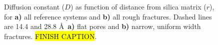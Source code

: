 %
\begin{figure}[htpb]%
\setlength{\myfigwidth}{0.58\textwidth}%
\makebox[\textwidth][c]{ %
    \begin{minipage}[t]{\myfigwidth}%
        \centering%
        \subcaption{\label{fig:diffusion_reference_systems}}%
    \end{minipage}%
    \hfill%
    \begin{minipage}[t]{\myfigwidth}%
        \centering%
        \subcaption{\label{fig:diffusion_rough_systems}}%
    \end{minipage}%
}%
\caption{%
    Diffusion constant ($D$) as function of distance from silica matrix ($r$), for \textbf{a)} all reference systems and \textbf{b)} all rough fractures. Dashed lines are 14.4 and 28.8 \AA\ \textbf{a)} flat pores and \textbf{b)} narrow, uniform width fractures. \hl{FINISH CAPTION}. %
    \label{fig:first_diffusion_figure}%
}%
\end{figure}%




